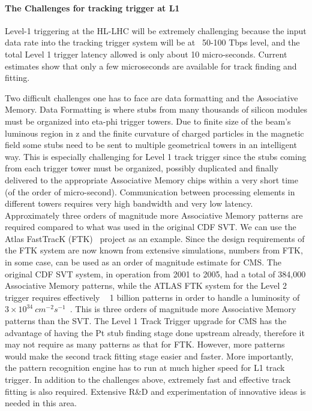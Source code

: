 \paragraph{\bf The Challenges for tracking trigger at L1\\}

\noindent Level-1 triggering at the HL-LHC will be extremely challenging because the input data rate into the tracking trigger system will be at ~50-100 Tbps level, and the total Level 1 trigger latency allowed is only about 10 micro-seconds. Current estimates show that only a few microseconds are available for track finding and fitting.  

\noindent Two difficult challenges one has to face are data formatting and the Associative Memory. Data Formatting is where stubs from many thousands of silicon modules must be organized into eta-phi trigger towers. Due to finite size of the beam's luminous region in z and the finite curvature of charged particles in the magnetic field some stubs need to be sent to multiple geometrical towers in an intelligent way. This is especially challenging for Level 1 track trigger since the stubs coming from each trigger tower must be organized, possibly duplicated and finally delivered to the appropriate Associative Memory chips within a very short time (of the order of micro-second). Communication between processing elements in different towers requires very high bandwidth and very low latency. Approximately three orders of magnitude more Associative Memory patterns are required compared to what was used in the original CDF SVT. We can use the Atlas FastTracK (FTK)~\cite{bib:FTK-10} project as an example. Since the design requirements of the FTK system are now known from extensive simulations, numbers from FTK, in some case, can be used as an order of magnitude estimate for CMS. The original CDF SVT system, in operation from 2001 to 2005, had a total of 384,000 Associative Memory patterns, while the ATLAS FTK system for the Level 2 trigger requires effectively ~ 1 billion patterns in order to handle a luminosity of $3\times10^{34}~cm^{-2}s^{-1}$~\cite{bib:FTK-10}. This is three orders of magnitude more Associative Memory patterns than the SVT. The Level 1 Track Trigger upgrade for CMS has the advantage of having the Pt stub finding stage done upstream already, therefore it may not require as many patterns as that for FTK. However, more patterns would make the second track fitting stage easier and faster. More importantly, the pattern recognition engine has to run at much higher speed for L1 track trigger. In addition to the challenges above, extremely fast and effective track fitting is also required. Extensive R\&D and experimentation of innovative ideas is needed in this area.

